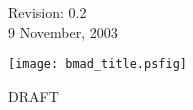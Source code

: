 \thispagestyle{empty}

\begin{flushright}
\large
  Revision: 0.2 \\
  9 November, 2003 \\
\end{flushright}

\vfill

{
\begin{center}
\texttt{[image: bmad\_title.psfig]} \\
\end{center}
}

\vskip 1in
\begin{center}
\Huge DRAFT
\end{center}
\vfill
\break